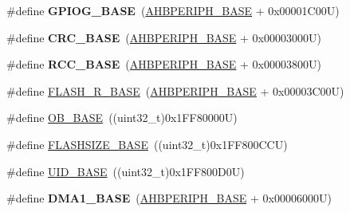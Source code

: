 \begin{DoxyCompactItemize}
\item 
\hypertarget{group___peripheral__memory__map_ga5d8ca4020f2e8c00bde974e8e7c13cfe}{\#define {\bfseries G\-P\-I\-O\-G\-\_\-\-B\-A\-S\-E}~(\hyperlink{group___peripheral__memory__map_ga92eb5d49730765d2abd0f5b09548f9f5}{A\-H\-B\-P\-E\-R\-I\-P\-H\-\_\-\-B\-A\-S\-E} + 0x00001\-C00\-U)}\label{group___peripheral__memory__map_ga5d8ca4020f2e8c00bde974e8e7c13cfe}

\item 
\hypertarget{group___peripheral__memory__map_ga656a447589e785594cbf2f45c835ad7e}{\#define {\bfseries C\-R\-C\-\_\-\-B\-A\-S\-E}~(\hyperlink{group___peripheral__memory__map_ga92eb5d49730765d2abd0f5b09548f9f5}{A\-H\-B\-P\-E\-R\-I\-P\-H\-\_\-\-B\-A\-S\-E} + 0x00003000\-U)}\label{group___peripheral__memory__map_ga656a447589e785594cbf2f45c835ad7e}

\item 
\hypertarget{group___peripheral__memory__map_ga0e681b03f364532055d88f63fec0d99d}{\#define {\bfseries R\-C\-C\-\_\-\-B\-A\-S\-E}~(\hyperlink{group___peripheral__memory__map_ga92eb5d49730765d2abd0f5b09548f9f5}{A\-H\-B\-P\-E\-R\-I\-P\-H\-\_\-\-B\-A\-S\-E} + 0x00003800\-U)}\label{group___peripheral__memory__map_ga0e681b03f364532055d88f63fec0d99d}

\item 
\#define \hyperlink{group___peripheral__memory__map_ga8e21f4845015730c5731763169ec0e9b}{F\-L\-A\-S\-H\-\_\-\-R\-\_\-\-B\-A\-S\-E}~(\hyperlink{group___peripheral__memory__map_ga92eb5d49730765d2abd0f5b09548f9f5}{A\-H\-B\-P\-E\-R\-I\-P\-H\-\_\-\-B\-A\-S\-E} + 0x00003\-C00\-U)
\item 
\#define \hyperlink{group___peripheral__memory__map_gab5b5fb155f9ee15dfb6d757da1adc926}{O\-B\-\_\-\-B\-A\-S\-E}~((uint32\-\_\-t)0x1\-F\-F80000\-U)
\item 
\#define \hyperlink{group___peripheral__memory__map_ga776d985f2d4d40b588ef6ca9d573af78}{F\-L\-A\-S\-H\-S\-I\-Z\-E\-\_\-\-B\-A\-S\-E}~((uint32\-\_\-t)0x1\-F\-F800\-C\-C\-U)
\item 
\#define \hyperlink{group___peripheral__memory__map_ga664eda42b83c919b153b07b23348be67}{U\-I\-D\-\_\-\-B\-A\-S\-E}~((uint32\-\_\-t)0x1\-F\-F800\-D0\-U)
\item 
\hypertarget{group___peripheral__memory__map_gab2d8a917a0e4ea99a22ac6ebf279bc72}{\#define {\bfseries D\-M\-A1\-\_\-\-B\-A\-S\-E}~(\hyperlink{group___peripheral__memory__map_ga92eb5d49730765d2abd0f5b09548f9f5}{A\-H\-B\-P\-E\-R\-I\-P\-H\-\_\-\-B\-A\-S\-E} + 0x00006000\-U)}\label{group___peripheral__memory__map_gab2d8a917a0e4ea99a22ac6ebf279bc72}


\end{DoxyCompactItemize}
